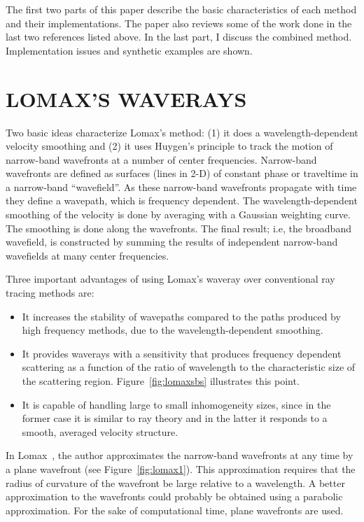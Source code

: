 The first two parts of this paper describe the 
basic characteristics of each method and their
implementations. The paper also reviews some of the work
done in the last two references listed above. 
In the last part, I discuss
the combined method. Implementation issues and synthetic
examples are shown.

\section{LOMAX'S WAVERAYS}

Two basic ideas characterize Lomax's method: (1)
it does a wavelength-dependent velocity smoothing and
(2) it uses Huygen's principle to track the motion
of narrow-band wavefronts at a number of center frequencies.
Narrow-band wavefronts are defined as surfaces (lines in \mbox{2-D})
of constant phase or traveltime in a narrow-band ``wavefield''.
As these narrow-band wavefronts propagate with time they define
a wavepath, which is frequency dependent. The wavelength-dependent
smoothing of the velocity is done by averaging with a Gaussian weighting 
curve. The smoothing is done along the wavefronts. The final result; i.e,
the broadband wavefield, is constructed by summing the results of 
independent narrow-band wavefields at many center frequencies.

Three important advantages of using Lomax's waveray over conventional
ray tracing methods are: 
\begin{itemize}
 \item It increases the stability of wavepaths compared
  to the paths produced by high frequency methods, due to the
  wavelength-dependent smoothing.
 \item It provides 
  waverays with a sensitivity that produces
  frequency dependent scattering as a function of the ratio of 
  wavelength to the characteristic size of the scattering region.
  Figure~\ref{fig:lomaxsbs} illustrates this point.
 \item It is capable of handling large to small inhomogeneity sizes,
  since in the former case it is similar to ray theory and in the
  latter it responds to a smooth, averaged velocity structure. 
\end{itemize}

In Lomax~, the author approximates 
the narrow-band wavefronts at any
time by a plane wavefront
(see Figure~\ref{fig:lomax1}). This
approximation requires that the radius of curvature of the wavefront 
be large relative to a wavelength.
A better approximation
to the wavefronts could probably 
be obtained using a parabolic approximation.
For the sake of computational time, plane wavefronts are used.

